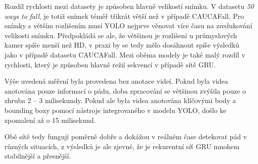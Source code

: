 Rozdíl rychlosti mezi datasety je způsoben hlavně velikostí snímku. V datasetu
\textit{50 ways to fall}, je totiž snímek téměř třikrát větší než v případě CAUCAFall.
Pro snímky s větším rozlišením musí YOLO nejprve věnovat více času na
zredukování velikosti snímku. Předpokládá se ale, že většinou je rozlišení u
průmyslových kamer spíše menší než HD, v praxi by se tedy mělo dosáhnout spíše
výsledků jako v případě datasetu CAUCAFall. Mezi oběma modely je také malý rozdíl v
rychlosti, který je způsoben hlavně režií sekvencí v případě sítě GRU.

Výše uvedená měření byla provedena bez anotace videí. Pokud byla videa anotována pouze informací o pádu, doba zpracování se většinou zvýšila
pouze o zhruba 2 – 3 milisekundy. Pokud ale byla videa anotována klíčovými body
a bounding boxy pomocí nástroje integrovaného v modelu YOLO, došlo ke zpomalení až o 15
milisekund.

Obě sítě tedy fungují poměrně dobře a dokážou v reálném čase detekovat pád v
různých situacích, z výsledků je ale zjevné, že je rekurentní síť GRU mnohem
stabilnější a přesnější.

